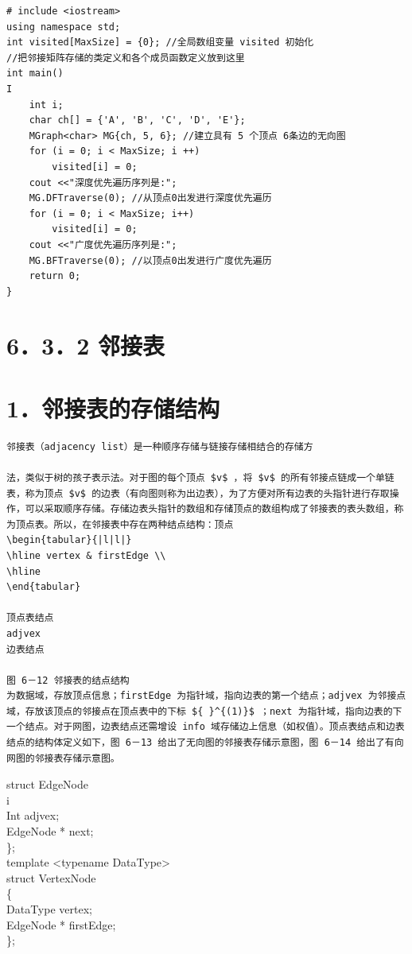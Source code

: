 \documentclass[10pt]{article}
\begin{document}
\begin{verbatim}
# include <iostream>
using namespace std;
int visited[MaxSize] = {0}; //全局数组变量 visited 初始化
//把邻接矩阵存储的类定义和各个成员函数定义放到这里
int main()
I
    int i;
    char ch[] = {'A', 'B', 'C', 'D', 'E'};
    MGraph<char> MG{ch, 5, 6}; //建立具有 5 个顶点 6条边的无向图
    for (i = 0; i < MaxSize; i ++)
        visited[i] = 0;
    cout <<"深度优先遍历序列是:";
    MG.DFTraverse(0); //从顶点0出发进行深度优先遍历
    for (i = 0; i < MaxSize; i++)
        visited[i] = 0;
    cout <<"广度优先遍历序列是:";
    MG.BFTraverse(0); //以顶点0出发进行广度优先遍历
    return 0;
}
\end{verbatim}

\section*{6．3．2 邻接表}
\section*{1．邻接表的存储结构}
\begin{verbatim}
邻接表（adjacency list）是一种顺序存储与链接存储相结合的存储方

法，类似于树的孩子表示法。对于图的每个顶点 $v$ ，将 $v$ 的所有邻接点链成一个单链表，称为顶点 $v$ 的边表（有向图则称为出边表），为了方便对所有边表的头指针进行存取操作，可以采取顺序存储。存储边表头指针的数组和存储顶点的数组构成了邻接表的表头数组，称为顶点表。所以，在邻接表中存在两种结点结构：顶点
\begin{tabular}{|l|l|}
\hline vertex & firstEdge \\
\hline
\end{tabular}

顶点表结点
adjvex
边表结点

图 6－12 邻接表的结点结构
为数据域，存放顶点信息；firstEdge 为指针域，指向边表的第一个结点；adjvex 为邻接点域，存放该顶点的邻接点在顶点表中的下标 ${ }^{(1)}$ ；next 为指针域，指向边表的下一个结点。对于网图，边表结点还需增设 info 域存储边上信息（如权值）。顶点表结点和边表结点的结构体定义如下，图 6－13 给出了无向图的邻接表存储示意图，图 6－14 给出了有向网图的邻接表存储示意图。
\end{verbatim}

struct EdgeNode\\
i\\
Int adjvex;\\
EdgeNode * next;\\
\};\\
template <typename DataType>\\
struct VertexNode\\
\{\\
DataType vertex;\\
EdgeNode * firstEdge;\\
\};
\end{document}
